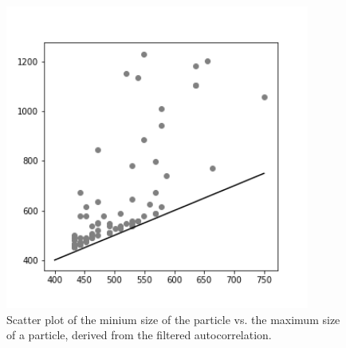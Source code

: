 \begin{figure}[!h]
\centering
\includegraphics[width=100mm]{Chapter_09_Results_Refined_Sizing.png}
\caption{Scatter plot of the minium size of the particle vs. the maximum size of a particle, derived from the filtered autocorrelation. }\label{fig:majorminor}

\end{figure}




